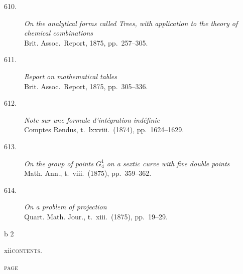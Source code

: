 \documentclass[11pt]{article}
\begin{document}
\begin{description}
\item[610.] \textit{On the analytical forms called Trees, with application to the theory of chemical combinations}\\
\hspace*{1em}\small Brit. Assoc.\ Report, 1875, pp.~257--305.

\item[611.] \textit{Report on mathematical tables}\\
\hspace*{1em}\small Brit. Assoc.\ Report, 1875, pp.~305--336.

\item[612.] \textit{Note sur une formule d'int\'egration ind\'efinie}\\
\hspace*{1em}\small Comptes Rendus, t.~lxxviii.\ (1874), pp.~1624--1629.

\item[613.] \textit{On the group of points $G_4^1$ on a sextic curve with five double points}\\
\hspace*{1em}\small Math. Ann., t.~viii.\ (1875), pp.~359--362.

\item[614.] \textit{On a problem of projection}\\
\hspace*{1em}\small Quart. Math. Jour., t.~xiii.\ (1875), pp.~19--29.
\end{description}

\vspace{1em}
\hfill\small b 2
\newpage

\thispagestyle{empty}
\noindent\small xii\hfill\textsc{contents.}
\vspace*{1em}

\noindent\hfill\textsc{page}

\medskip
\end{document}
